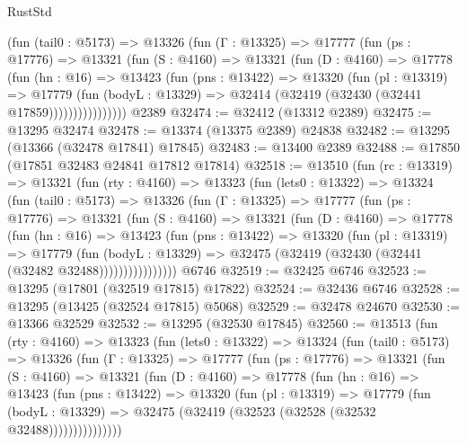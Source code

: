\begin{lexlean}{RustStd}
\begin{coremodule}
            (fun (tail0 : @5173) =>
            @13326
              (fun (Γ : @13325) =>
              @17777
                (fun (ps : @17776) =>
                @13321
                  (fun (S : @4160) =>
                  @13321
                    (fun (D : @4160) =>
                    @17778
                      (fun (hn : @16) =>
                      @13423
                        (fun (pns : @13422) =>
                        @13320
                          (fun (pl : @13319) =>
                          @17779
                            (fun (bodyL : @13329) =>
                            @32414 (@32419 (@32430 (@32441 @17859))))))))))))))))
    @2389
@32474 := @32412 (@13312 @2389)
@32475 := @13295 @32474
@32478 := @13374 (@13375 @2389) @24838
@32482 := @13295 (@13366 (@32478 @17841) @17845)
@32483 := @13400 @2389
@32488 := @17850 (@17851 @32483 @24841 @17812 @17814)
@32518 := @13510
    (fun (rc : @13319) =>
    @13321
      (fun (rty : @4160) =>
      @13323
        (fun (lets0 : @13322) =>
        @13324
          (fun (tail0 : @5173) =>
          @13326
            (fun (Γ : @13325) =>
            @17777
              (fun (ps : @17776) =>
              @13321
                (fun (S : @4160) =>
                @13321
                  (fun (D : @4160) =>
                  @17778
                    (fun (hn : @16) =>
                    @13423
                      (fun (pns : @13422) =>
                      @13320
                        (fun (pl : @13319) =>
                        @17779
                          (fun (bodyL : @13329) =>
                          @32475 (@32419 (@32430 (@32441 (@32482 @32488))))))))))))))))
    @6746
@32519 := @32425 @6746
@32523 := @13295 (@17801 (@32519 @17815) @17822)
@32524 := @32436 @6746
@32528 := @13295 (@13425 (@32524 @17815) @5068)
@32529 := @32478 @24670
@32530 := @13366 @32529
@32532 := @13295 (@32530 @17845)
@32560 := @13513
    (fun (rty : @4160) =>
    @13323
      (fun (lets0 : @13322) =>
      @13324
        (fun (tail0 : @5173) =>
        @13326
          (fun (Γ : @13325) =>
          @17777
            (fun (ps : @17776) =>
            @13321
              (fun (S : @4160) =>
              @13321
                (fun (D : @4160) =>
                @17778
                  (fun (hn : @16) =>
                  @13423
                    (fun (pns : @13422) =>
                    @13320
                      (fun (pl : @13319) =>
                      @17779
                        (fun (bodyL : @13329) =>
                        @32475 (@32419 (@32523 (@32528 (@32532 @32488)))))))))))))))

\end{coremodule}
\end{lexlean}
